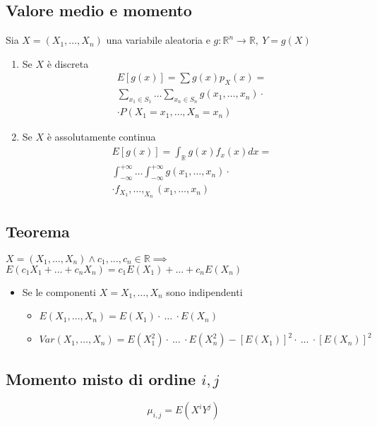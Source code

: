 \begin{multicols*}{2}
\subsection*{Valore medio e momento}
Sia $X= (X_1,\dots,X_n)$ una variabile aleatoria e $g: \mathbb{R}^n \to \mathbb{R}, \ Y = g(X)$
\begin{enumerate}
    \item Se $X$ è discreta
    \begin{align*}
    E[g(x)] = \sum g(x)p_X(x) =
    \\\sum_{x_1 \in S_1} \dots \sum_{x_n \in S_n}
    g(x_1,\dots,x_n) \cdot
    \\\cdot P(X_1=x_1,\dots,X_n=x_n)
    \end{align*}
    \item Se $X$ è assolutamente continua
    \begin{align*}
    E[g(x)] = \int_{\mathbb{R}} g(x)f_x(x) dx =
    \\\int_{-\infty}^{+\infty} \dots \int_{-\infty}^{+\infty}
    g(x_1,\dots,x_n) \cdot
    \\\cdot f_{X_1},\dots,_{X_n}(x_1,\dots,x_n)
    \end{align*}
\end{enumerate}

\subsection*{Teorema}
$X = (X_1,\dots,X_n) \land c_1,\dots,c_n \in \mathbb{R} \implies$
$E(c_1 X_1 + \dots + c_n X_n) = c_1 E(X_1) + \dots + c_n E(X_n)$
\begin{itemize}
    \item Se le componenti $X = X_1, \dots, X_n$ sono indipendenti
    \begin{itemize}
        \item $E(X_1,\dots,X_n) = E(X_1) \cdot \ \dots \ \cdot E(X_n)$
        \item $\mathit{Var}(X_1,\dots,X_n) = E(X_1^2) \cdot \ \dots \ \cdot E(X_n^2)
        - [E(X_1)]^2 \cdot \ \dots \ \cdot [E(X_n)]^2
        $
    \end{itemize}
\end{itemize}

\subsection*{Momento misto di ordine $i,j$}
$$
\mu_{i,j} = E(X^i Y^j)
$$


\end{multicols*}
